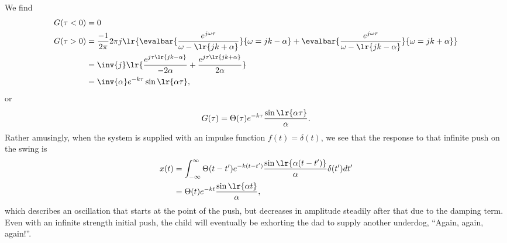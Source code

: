 {We find
\begin{equation}\label{eqn:greensIntroProblem:80}
\begin{aligned}
G(\tau < 0) &= 0 \\
G(\tau > 0) &=
\frac{-1}{2 \pi} 2 \pi j \lr{
   \evalbar{
   \frac{e^{j \omega \tau}}{\omega - \lr{ j k + \alpha } }
   }
   {
      \omega = j k - \alpha
   }
   +
   \evalbar{
   \frac{e^{j \omega \tau}}{\omega - \lr{ j k - \alpha } }
   }
   {
      \omega = j k + \alpha
   }
} \\
&=
\inv{j} \lr{
   \frac{e^{j \tau \lr{ j k - \alpha } }}{-2\alpha}
   +
   \frac{e^{j \tau \lr{ j k + \alpha } }}{ 2\alpha}
} \\
&=
\inv{\alpha} e^{ - k \tau } \sin\lr{ \alpha \tau },
\end{aligned}
\end{equation}
or
\begin{equation}\label{eqn:greensIntroProblem:100}
G(\tau) = \Theta(\tau) e^{ - k \tau } \frac{ \sin\lr{ \alpha \tau } }{\alpha}.
\end{equation}
Rather amusingly, when the system is supplied with an impulse function \( f(t) = \delta(t) \), we see that the response to that infinite push on the swing is
\begin{equation}\label{eqn:greensIntroProblem:120}
\begin{aligned}
x(t)
&= \int_{-\infty}^\infty \Theta(t-t') e^{ - k (t-t') } \frac{ \sin\lr{ \alpha (t-t') } }{\alpha} \delta(t') dt' \\
&= \Theta(t) e^{-k t} \frac{ \sin\lr{ \alpha t } }{\alpha},
\end{aligned}
\end{equation}
which describes an oscillation that starts at the point of the push, but decreases in amplitude steadily after that due to the damping term.  Even with an infinite strength initial push, the child will eventually be exhorting the dad to supply another underdog, ``Again, again, again!''.
} %
